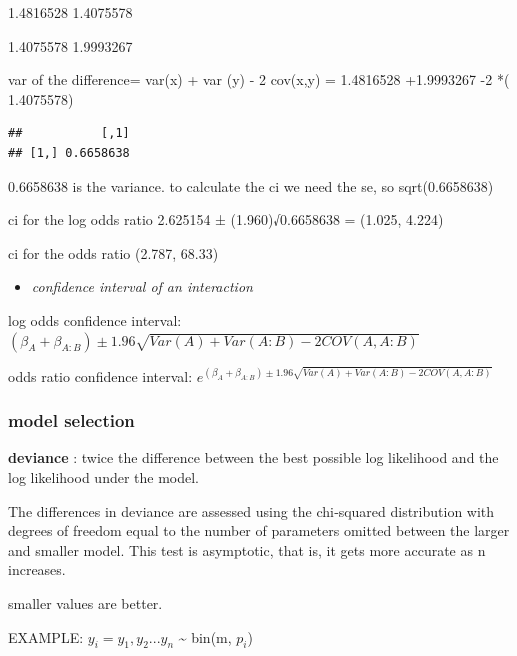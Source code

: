 \documentclass[
]{article}
\newenvironment{Shaded}{\begin{snugshade}}{\end{snugshade}}
\newcommand{\KeywordTok}[1]{\textcolor[rgb]{0.13,0.29,0.53}{\textbf{#1}}}
\newcommand{\NormalTok}[1]{#1}
\newcommand{\OperatorTok}[1]{\textcolor[rgb]{0.81,0.36,0.00}{\textbf{#1}}}
\newcommand{\StringTok}[1]{\textcolor[rgb]{0.31,0.60,0.02}{#1}}
\providecommand{\tightlist}{%
  \setlength{\itemsep}{0pt}\setlength{\parskip}{0pt}}
\begin{document}
1.4816528 1.4075578

1.4075578 1.9993267

var of the difference= var(x) + var (y) - 2 cov(x,y) = 1.4816528
+1.9993267 -2 *( 1.4075578)

\begin{Shaded}
\end{Shaded}

\begin{verbatim}
##           [,1]
## [1,] 0.6658638
\end{verbatim}

0.6658638 is the variance. to calculate the ci we need the se, so
sqrt(0.6658638)

ci for the log odds ratio 2.625154 ± (1.960)√0.6658638 = (1.025, 4.224)

ci for the odds ratio (2.787, 68.33)

\begin{itemize}
\tightlist
\item
  \emph{confidence interval of an interaction}
\end{itemize}

log odds confidence interval:
\((\beta_A + \beta_{A:B}) \pm 1.96 \sqrt{Var(A) + Var(A:B) - 2COV(A,A:B)}\)

odds ratio confidence interval:
\(e^{(\beta_A + \beta_{A:B}) \pm 1.96 \sqrt{Var(A) + Var(A:B) - 2COV(A,A:B)}}\)

\hypertarget{model-selection}{%
\subsubsection{model selection}\label{model-selection}}

\textbf{deviance} : twice the difference between the best possible log
likelihood and the log likelihood under the model.

The differences in deviance are assessed using the chi‐squared
distribution with degrees of freedom equal to the number of parameters
omitted between the larger and smaller model. This test is asymptotic,
that is, it gets more accurate as n increases.

smaller values are better.

EXAMPLE: \(y_{i} = y_{1}, y_{2}...y_{n}\) \textasciitilde{} bin(m,
\(p_{i}\))
\end{document}
